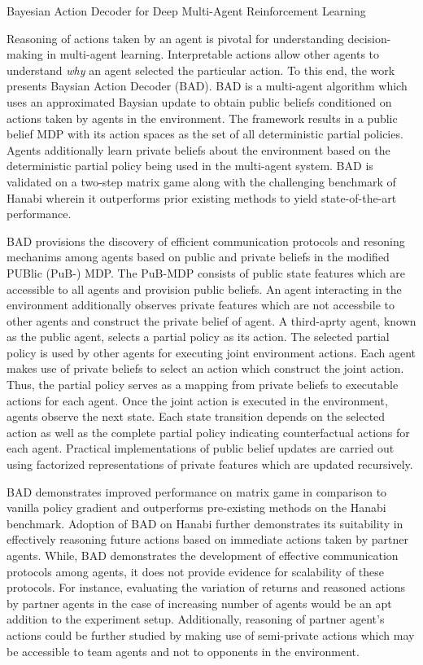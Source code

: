 \documentclass[11pt,letterpaper]{article}
\begin{document}
\begin{center}
  \large{Bayesian Action Decoder for Deep Multi-Agent Reinforcement Learning}
\end{center}

Reasoning of actions taken by an agent is pivotal for understanding decision-making in multi-agent learning. Interpretable actions allow other agents to understand \textit{why} an agent selected the particular action. To this end, the work presents Baysian Action Decoder (BAD). BAD is a multi-agent algorithm which uses an approximated Baysian update to obtain public beliefs conditioned on actions taken by agents in the environment. The framework results in a public belief MDP with its action spaces as the set of all deterministic partial policies. Agents additionally learn private beliefs about the environment based on the deterministic partial policy being used in the multi-agent system. BAD is validated on a two-step matrix game along with the challenging benchmark of Hanabi wherein it outperforms prior existing methods to yield state-of-the-art performance. 

BAD provisions the discovery of efficient communication protocols and resoning mechanims among agents based on public and private beliefs in the modified PUBlic (PuB-) MDP. The PuB-MDP consists of public state features which are accessible to all agents and provision public beliefs. An agent interacting in the environment additionally observes private features which are not accessbile to other agents and construct the private belief of agent. A third-aprty agent, known as the public agent, selects a partial policy as its action. The selected partial policy is used by other agents for executing joint environment actions. Each agent makes use of private beliefs to select an action which construct the joint action. Thus, the partial policy serves as a mapping from private beliefs to executable actions for each agent. Once the joint action is executed in the environment, agents observe the next state. Each state transition depends on the selected action as well as the complete partial policy indicating counterfactual actions for each agent. Practical implementations of public belief updates are carried out using factorized representations of private features which are updated recursively. 

BAD demonstrates improved performance on matrix game in comparison to vanilla policy gradient and outperforms pre-existing methods on the Hanabi benchmark. Adoption of BAD on Hanabi further demonstrates its suitability in effectively reasoning future actions based on immediate actions taken by partner agents. While, BAD demonstrates the development of effective communication protocols among agents, it does not provide evidence for scalability of these protocols. For instance, evaluating the variation of returns and reasoned actions by partner agents in the case of increasing number of agents would be an apt addition to the experiment setup. Additionally, reasoning of partner agent's actions could be further studied by making use of semi-private actions which may be accessible to team agents and not to opponents in the environment. 
\end{document}
